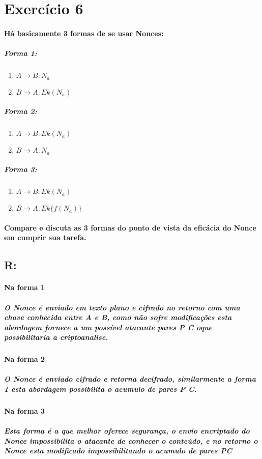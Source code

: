 \documentclass[10pt,a4paper]{report}
\begin{document}
\section*{Exercício 6}
\paragraph{Há basicamente 3 formas de se usar Nonces:}
\subparagraph{Forma 1:}
\begin{enumerate}[(1)]
\item $A \rightarrow B : N_a$
\item $B \rightarrow A : Ek(N_a)$
\end{enumerate}
\subparagraph{Forma 2:}
\begin{enumerate}[(1)]
\item $A \rightarrow B : Ek(N_a)$
\item $B \rightarrow A : N_a$
\end{enumerate}
\subparagraph{Forma 3:}
\begin{enumerate}[(1)]
\item $A \rightarrow B : Ek(N_a)$
\item $B \rightarrow A : Ek\{f(N_a)\}$
\end{enumerate}
\paragraph{Compare e discuta as 3 formas do ponto de vista da eficácia do Nonce em cumprir sua tarefa.}
\subsection*{R:}
\paragraph{Na forma 1}
\subparagraph{O Nonce é enviado em texto plano e cifrado no retorno com uma chave conhecida entre A e B, como não sofre modificações esta abordagem fornece a um possível atacante pares P C oque possibilitaria a criptoanalise.}
\paragraph{Na forma 2}
\subparagraph{O Nonce é enviado cifrado e retorna decifrado, similarmente a forma 1 esta abordagem possibilita o acumulo de pares P C.}
\paragraph{Na forma 3}
\subparagraph{ Esta forma é a que melhor oferece segurança, o envio encriptado do Nonce impossibilita o atacante de conhecer o conteúdo, e no retorno o Nonce esta modificado impossibilitando o acumulo de pares PC}
\end{document}

